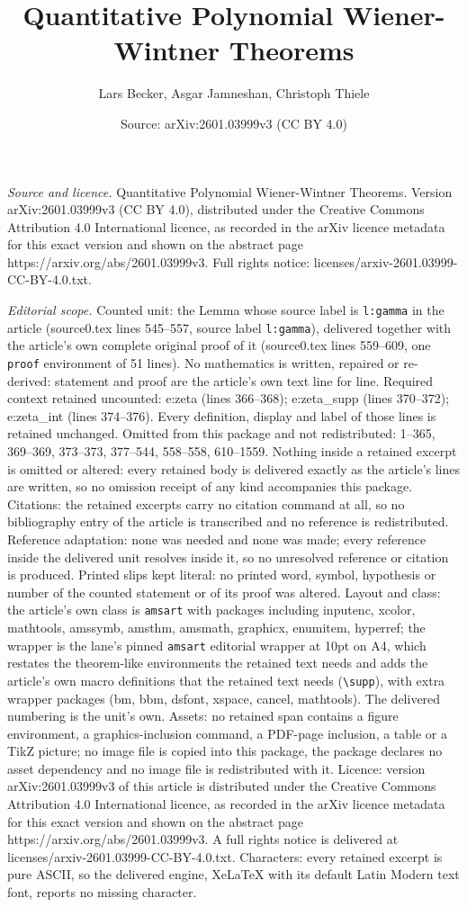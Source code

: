 \documentclass[10pt,a4paper]{amsart}
\title[Quantitative Polynomial Wiener-Wintner Theorems]{Quantitative Polynomial Wiener-Wintner Theorems}
\author{Lars Becker, Asgar Jamneshan, Christoph Thiele}
\date{Source: arXiv:2601.03999v3 (CC BY 4.0)}
\begin{document}
\maketitle

\noindent\emph{Source and licence.} Quantitative Polynomial Wiener-Wintner Theorems. Version arXiv:2601.03999v3 (CC BY 4.0), distributed under the Creative Commons Attribution 4.0 International licence, as recorded in the arXiv licence metadata for this exact version and shown on the abstract page https://arxiv.org/abs/2601.03999v3. Full rights notice: licenses/arxiv-2601.03999-CC-BY-4.0.txt.\par\smallskip

\noindent\textit{Editorial scope.} Counted unit: the Lemma whose source label is \texttt{l:gamma} in the article (source0.tex lines 545--557, source label \texttt{l:gamma}), delivered together with the article's own complete original proof of it (source0.tex lines 559--609, one \texttt{proof} environment of 51 lines). No mathematics is written, repaired or re-derived: statement and proof are the article's own text line for line. Required context retained uncounted: e:zeta (lines 366--368); e:zeta\_supp (lines 370--372); e:zeta\_int (lines 374--376). Every definition, display and label of those lines is retained unchanged. Omitted from this package and not redistributed: 1--365, 369--369, 373--373, 377--544, 558--558, 610--1559. Nothing inside a retained excerpt is omitted or altered: every retained body is delivered exactly as the article's lines are written, so no omission receipt of any kind accompanies this package. Citations: the retained excerpts carry no citation command at all, so no bibliography entry of the article is transcribed and no reference is redistributed. Reference adaptation: none was needed and none was made; every reference inside the delivered unit resolves inside it, so no unresolved reference or citation is produced. Printed slips kept literal: no printed word, symbol, hypothesis or number of the counted statement or of its proof was altered. Layout and class: the article's own class is \texttt{amsart} with packages including inputenc, xcolor, mathtools, amssymb, amsthm, amsmath, graphicx, enumitem, hyperref; the wrapper is the lane's pinned \texttt{amsart} editorial wrapper at 10pt on A4, which restates the theorem-like environments the retained text needs and adds the article's own macro definitions that the retained text needs (\texttt{\textbackslash supp}), with extra wrapper packages (bm, bbm, dsfont, xspace, cancel, mathtools). The delivered numbering is the unit's own. Assets: no retained span contains a figure environment, a graphics-inclusion command, a PDF-page inclusion, a table or a TikZ picture; no image file is copied into this package, the package declares no asset dependency and no image file is redistributed with it. Licence: version arXiv:2601.03999v3 of this article is distributed under the Creative Commons Attribution 4.0 International licence, as recorded in the arXiv licence metadata for this exact version and shown on the abstract page https://arxiv.org/abs/2601.03999v3. A full rights notice is delivered at licenses/arxiv-2601.03999-CC-BY-4.0.txt. Characters: every retained excerpt is pure ASCII, so the delivered engine, XeLaTeX with its default Latin Modern text font, reports no missing character.
\end{document}
